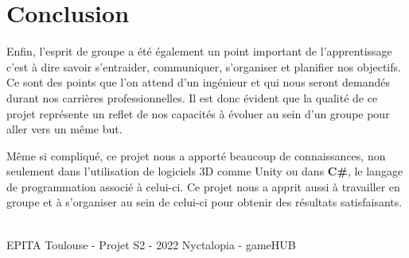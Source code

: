 \section{Conclusion}

Enfin, l'esprit de groupe a été également un point important de l'apprentissage c'est à dire savoir s'entraider, communiquer, s'organiser et planifier nos objectifs. Ce sont des points que l'on attend d'un ingénieur et qui nous seront demandés durant nos carrières professionnelles. Il est donc évident que la qualité de ce projet représente un reflet de nos capacités à évoluer au sein d'un groupe pour aller vers un même but.

Même si compliqué, ce projet nous a apporté beaucoup de connaissances, non seulement dans l'utilisation de logiciels 3D comme Unity ou dans \textbf{C\#}, le langage de programmation associé à celui-ci. Ce projet nous a apprit aussi à travailler en groupe et à s'organiser au sein de celui-ci pour obtenir des résultats satisfaisants. 

\vfill
\noindent\makebox[\linewidth]{\rule{.8\paperwidth}{.6pt}}\\[0.2cm]
EPITA Toulouse - Projet S2 - 2022 \hfill Nyctalopia - gameHUB
\noindent\makebox[\linewidth]{\rule{.8\paperwidth}{.6pt}}
